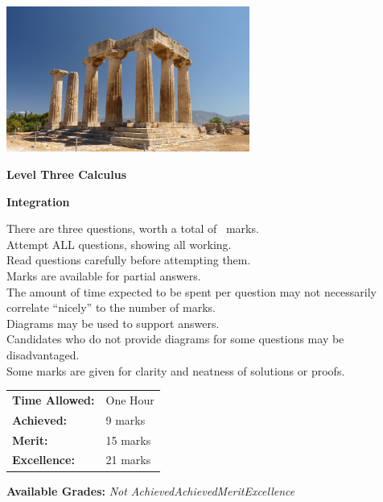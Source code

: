 \documentclass[a4paper,addpoints]{exam}
\begin{document}
\begin{coverpages}

\begin{center}
  \includegraphics[width=0.6\textwidth]{exam-cover-06}

  \vspace{5mm}

  \textbf{\Huge{Level Three Calculus}}

  \vspace{2mm}

  \textbf{\Huge{Integration}}
\end{center}

\vspace{5mm}

\noindent
\large{There are three questions, worth a total of \numpoints\ marks.\\
       Attempt ALL questions, showing all working.\\
       Read questions carefully before attempting them.\\
       Marks are available for partial answers.\\
       The amount of time expected to be spent per question may not necessarily correlate ``nicely'' to the number of marks.\\
       Diagrams may be used to support answers.\\
       Candidates who do not provide diagrams for some questions may be disadvantaged.\\
       Some marks are given for clarity and neatness of solutions or proofs.}
\vspace{2mm}

\begin{tabular}{ll}
  \textbf{Time Allowed:}& One Hour\\
  \textbf{Achieved:}& 9 marks\\
  \textbf{Merit:}& 15 marks\\
  \textbf{Excellence:}& 21 marks
\end{tabular}

\vfill

\begin{center}
  \gradetable[h][questions]
  \vspace{2mm}

  \textbf{Available Grades:} \textit{Not Achieved}\quad\textit{Achieved}\quad\textit{Merit}\quad\textit{Excellence}
\end{center}

\end{coverpages}
\end{document}
